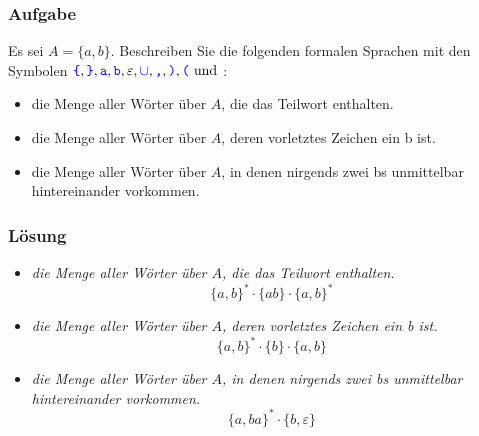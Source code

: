 \begin{frame}
	\frametitle{Aufgabe }
	Es sei $A = \{a, b\}$. Beschreiben Sie die folgenden formalen Sprachen mit den Symbolen $\hbox{\textcolor{blue}{\texttt{\{}}}, \hbox{\textcolor{blue}{\texttt{\}}}}, \hbox{\textcolor{blue}{\texttt{a}}}, \hbox{\textcolor{blue}{\texttt{b}}}, \varepsilon, 
	\hbox{\textcolor{blue}{$\mathtt{\cup}$}}, 
	\hbox{\textcolor{blue}{\texttt{,}}} , \hbox{\textcolor{blue}{\texttt{)}}}, \hbox{\textcolor{blue}{\texttt{(}}} \text{ und } 
	$:
	\begin{itemize}
		\item die Menge aller Wörter über $A$, die das Teilwort  enthalten.
		\item die Menge aller Wörter über $A$, deren vorletztes Zeichen ein \word b ist.
		\item die Menge aller Wörter über $A$, in denen nirgends zwei \word bs unmittelbar hintereinander vorkommen.
	\end{itemize}
\end{frame}

\begin{frame}
	\frametitle{Lösung}
	\begin{itemize}
		\item \textit{die Menge aller Wörter über $A$, die das Teilwort  enthalten.}  \pause
			$$\{a,b\}^\ast \cdot \{ab\} \cdot \{a,b\}^\ast$$ \pause
		\item \textit{die Menge aller Wörter über $A$, deren vorletztes Zeichen ein b ist.}  \pause
			$$\{a,b\}^\ast \cdot \{b\} \cdot \{a,b\}$$ \pause
		\item \textit{die Menge aller Wörter über $A$, in denen nirgends zwei \word bs unmittelbar hintereinander vorkommen.}  \pause
			$$\{a, ba\}^\ast \cdot \{b, \varepsilon \}$$
	\end{itemize}
\end{frame}

